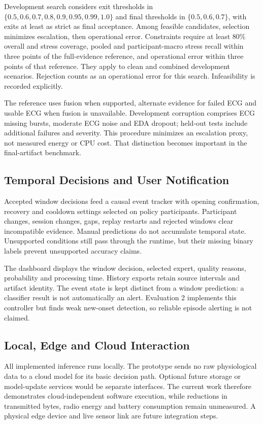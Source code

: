 \documentclass[conference,a4paper]{IEEEtran}
\newcommand{\pct}{\%}
\begin{document}
Development search considers exit thresholds in $\{0.5,0.6,0.7,0.8,0.9,0.95,0.99,1.0\}$ and final thresholds in $\{0.5,0.6,0.7\}$, with exits at least as strict as final acceptance. Among feasible candidates, selection minimizes escalation, then operational error. Constraints require at least 80\pct{} overall and stress coverage, pooled and participant-macro stress recall within three points of the full-evidence reference, and operational error within three points of that reference. They apply to clean and combined development scenarios. Rejection counts as an operational error for this search. Infeasibility is recorded explicitly.

The reference uses fusion when supported, alternate evidence for failed ECG and usable ECG when fusion is unavailable. Development corruption comprises ECG missing bursts, moderate ECG noise and EDA dropout; held-out tests include additional failures and severity. This procedure minimizes an escalation proxy, not measured energy or CPU cost. That distinction becomes important in the final-artifact benchmark.

\subsection{Temporal Decisions and User Notification}
Accepted window decisions feed a causal event tracker with opening confirmation, recovery and cooldown settings selected on policy participants. Participant changes, session changes, gaps, replay restarts and rejected windows clear incompatible evidence. Manual predictions do not accumulate temporal state. Unsupported conditions still pass through the runtime, but their missing binary labels prevent unsupported accuracy claims.

The dashboard displays the window decision, selected expert, quality reasons, probability and processing time. History exports retain source intervals and artifact identity. The event state is kept distinct from a window prediction: a classifier result is not automatically an alert. Evaluation 2 implements this controller but finds weak new-onset detection, so reliable episode alerting is not claimed.

\subsection{Local, Edge and Cloud Interaction}
All implemented inference runs locally. The prototype sends no raw physiological data to a cloud model for its basic decision path. Optional future storage or model-update services would be separate interfaces. The current work therefore demonstrates cloud-independent software execution, while reductions in transmitted bytes, radio energy and battery consumption remain unmeasured. A physical edge device and live sensor link are future integration steps.
\end{document}
